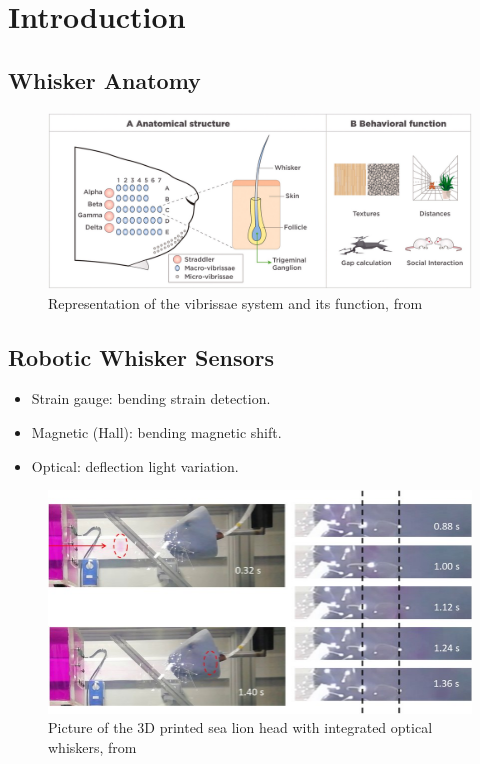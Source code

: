

\chapter{Introduction}


\section{Whisker Anatomy}
\begin{figure}[htb]
    \centering
    \includegraphics[width=\textwidth]{figures/whisker-anatomy}
    \caption{Representation of the vibrissae system and its function, from~\cite{IBARRACASTANEDA2022100034}}
\end{figure}


\section{Robotic Whisker Sensors}

\begin{itemize}
    \item Strain gauge: bending \to strain detection.
    \item Magnetic (Hall): bending \to magnetic shift.
    \item Optical: deflection \to light variation.
\end{itemize}
\begin{figure}[htb]
    \centering
    \includegraphics[height=0.5\textheight]{figures/optical-whisker}
    \caption{Picture of the 3D printed sea lion head with integrated optical whiskers, from \cite{optical-whisker}}
\end{figure}


